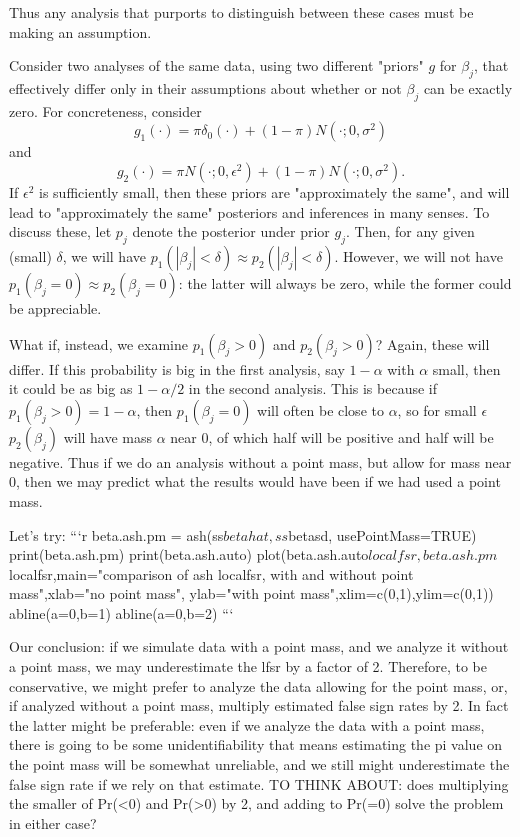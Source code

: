 \documentclass[11pt]{article}
\begin{document}
Thus any analysis that purports to distinguish between these cases must be making an assumption. 

Consider two analyses of the same data, using two different "priors" $g$ for $\beta_j$, that effectively differ only in their assumptions about whether or not $\beta_j$ can be exactly zero. For concreteness, consider
\[ g_1(\cdot) = \pi \delta_0(\cdot) + (1-\pi) N(\cdot; 0,\sigma^2) \]
and
\[g_2(\cdot) = \pi N(\cdot; 0, \epsilon^2) + (1-\pi) N(\cdot; 0, \sigma^2).\]
If $\epsilon^2$ is sufficiently small, then these 
priors are "approximately the same", and will lead to "approximately the same" posteriors and inferences in many senses. To discuss these, let $p_j$ denote the posterior under prior $g_j$. Then, for any given (small) $\delta$, we will have $p_1(|\beta_j|<\delta) \approx p_2(|\beta_j|< \delta)$. However, we will not have $p_1(\beta_j=0) \approx p_2(\beta_j=0)$: the latter will always be zero, while the former could be appreciable.

 What if, instead, we examine $p_1(\beta_j >0)$ and $p_2(\beta_j >0)$? Again, these will differ. If this probability is big in the first analysis, say $1-\alpha$ with $\alpha$ small, then it could be as big as $1-\alpha/2$ in the second analysis. This is because if $p_1(\beta_j>0)=1-\alpha$, then $p_1(\beta_j=0)$ will often be close to $\alpha$, so for small $\epsilon$ $p_2(\beta_j)$ will have mass $\alpha$ near 0, of which half will be positive and half will be negative. 
Thus if we do an analysis without a point mass, but allow
for mass near 0, then we may predict what the results would have been if we had used a point mass.

Let's try: 
```{r}
beta.ash.pm = ash(ss$betahat, ss$betasd, usePointMass=TRUE)
print(beta.ash.pm)
print(beta.ash.auto)
plot(beta.ash.auto$localfsr,beta.ash.pm$localfsr,main="comparison of ash localfsr, with and without point mass",xlab="no point mass", ylab="with point mass",xlim=c(0,1),ylim=c(0,1))
abline(a=0,b=1)
abline(a=0,b=2)
```

Our conclusion: if we simulate data with a point mass,
and we analyze it without a point mass, we may underestimate
the lfsr by a factor of 2. Therefore, to be conservative, we might prefer to analyze the data allowing for the point mass, or, if analyzed without a point mass, multiply estimated false sign rates by 2. In fact the latter might be preferable: even if we analyze the data with a point mass, there is going to be some unidentifiability
that means estimating the pi value on the point mass will be somewhat unreliable, and we still might underestimate the false sign rate if we rely on that estimate.  
TO THINK ABOUT: does multiplying the smaller of Pr(<0) and Pr(>0) by 2, and adding to Pr(=0) solve the problem in either case?
\end{document}

